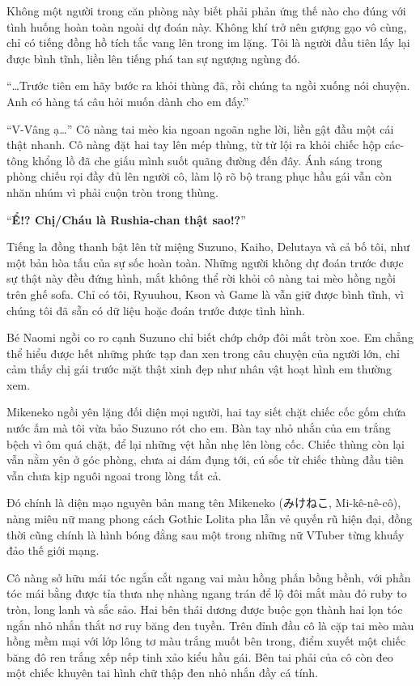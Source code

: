 ﻿\documentclass[../main.tex]{subfiles}
\begin{document}
Không một người trong căn phòng này biết phải phản ứng thế nào cho đúng với tình huống hoàn toàn ngoài dự đoán này. Không khí trở nên gượng gạo vô cùng, chỉ có tiếng đồng hồ tích tắc vang lên trong im lặng. Tôi là người đầu tiên lấy lại được bình tĩnh, liền lên tiếng phá tan sự ngượng ngùng đó.

``\dots Trước tiên em hãy bước ra khỏi thùng đã, rồi chúng ta ngồi xuống nói chuyện. Anh có hàng tá câu hỏi muốn dành cho em đấy.''

``V-Vâng ạ\dots'' Cô nàng tai mèo kia ngoan ngoãn nghe lời, liền gật đầu một cái thật nhanh. Cô nàng đặt hai tay lên mép thùng, từ từ lội ra khỏi chiếc hộp các-tông khổng lồ đã che giấu mình suốt quãng đường đến đây. Ánh sáng trong phòng chiếu rọi đầy đủ lên người cô, làm lộ rõ bộ trang phục hầu gái vẫn còn nhăn nhúm vì phải cuộn tròn trong thùng.

\ct

``\textbf{Ể!? Chị/Cháu là Rushia-chan thật sao!?}''

Tiếng la đồng thanh bật lên từ miệng Suzuno, Kaiho, Delutaya và cả bố tôi, như một bản hòa tấu của sự sốc hoàn toàn. Những người không dự đoán trước được sự thật này đều đứng hình, mắt không thể rời khỏi cô nàng tai mèo hồng ngồi trên ghế sofa. Chỉ có tôi, Ryuuhou, Kson và Game là vẫn giữ được bình tĩnh, vì chúng tôi đã sẵn có dữ liệu hoặc đoán trước được tình hình.

Bé Naomi ngồi co ro cạnh Suzuno chỉ biết chớp chớp đôi mắt tròn xoe. Em chẳng thể hiểu được hết những phức tạp đan xen trong câu chuyện của người lớn, chỉ cảm thấy chị gái trước mặt thật xinh đẹp như nhân vật hoạt hình em thường xem.

Mikeneko ngồi yên lặng đối diện mọi người, hai tay siết chặt chiếc cốc gốm chứa nước ấm mà tôi vừa bảo Suzuno rót cho em. Bàn tay nhỏ nhắn của em trắng bệch vì ôm quá chặt, để lại những vệt hằn nhẹ lên lòng cốc. Chiếc thùng còn lại vẫn nằm yên ở góc phòng, chưa ai dám đụng tới, cú sốc từ chiếc thùng đầu tiên vẫn chưa kịp nguôi ngoai trong lòng tất cả.

\chrint


Đó chính là diện mạo nguyên bản mang tên Mikeneko (みけねこ, Mi-kê-nê-cô), nàng miêu nữ mang phong cách Gothic Lolita pha lẫn vẻ quyến rũ hiện đại, đồng thời cũng chính là hình bóng đằng sau một trong những nữ VTuber từng khuấy đảo thế giới mạng.

Cô nàng sở hữu mái tóc ngắn cắt ngang vai màu hồng phấn bồng bềnh, với phần tóc mái bằng được tỉa thưa nhẹ nhàng ngang trán để lộ đôi mắt màu đỏ ruby to tròn, long lanh và sắc sảo. Hai bên thái dương được buộc gọn thành hai lọn tóc ngắn nhỏ nhắn thắt nơ ruy băng đen tuyền. Trên đỉnh đầu cô là cặp tai mèo màu hồng mềm mại với lớp lông tơ màu trắng muốt bên trong, điểm xuyết một chiếc băng đô ren trắng xếp nếp tinh xảo kiểu hầu gái. Bên tai phải của cô còn đeo một chiếc khuyên tai hình chữ thập đen nhỏ nhắn đầy cá tính.
\end{document}
